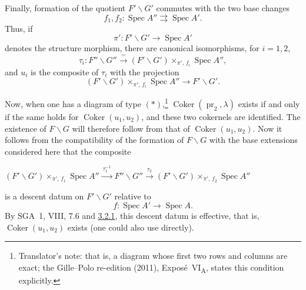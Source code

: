 Finally, formation of the quotient \(F'\backslash G'\) commutes with
the two base changes
\[
  f_1,f_2:\operatorname{Spec}A''
    \rightrightarrows \operatorname{Spec}A'.
\]
Thus, if
\[
  \pi':F'\backslash G'\longrightarrow\operatorname{Spec}A'
\]
denotes the structure morphism, there are canonical isomorphisms,
for \(i=1,2\),
\[
  \tau_i:F''\backslash G''
    \xrightarrow{\ \sim\ }
    (F'\backslash G')\times_{\pi',\,f_i}\operatorname{Spec}A'',
\]
and \(u_i\) is the composite of \(\tau_i\) with the projection
\[
  (F'\backslash G')\times_{\pi',\,f_i}\operatorname{Spec}A''
    \longrightarrow F'\backslash G'.
\]

Now, when one has a diagram of type \((*)\),\footnote{Translator's note: that is, a diagram whose first two
rows and columns are exact; the Gille--Polo re-edition (2011), Exposé~VI\textsubscript{A}, states this
condition explicitly.}
\(\operatorname{Coker}(\operatorname{pr}_2,\lambda)\) exists if and
only if the same holds for \(\operatorname{Coker}(u_1,u_2)\), and these two
cokernels are identified. The existence of \(F\backslash G\)
will therefore follow from that of \(\operatorname{Coker}(u_1,u_2)\).
Now it follows from the compatibility of the formation of \(F\backslash G\) with the
base extensions considered here that the composite
\begin{center}
  \label{diag:sga3-VIA-3.2.3-descent-datum}%
  \(
  (F'\backslash G')\times_{\pi',\,f_1}\operatorname{Spec}A''
    \xrightarrow{\ \tau_1^{-1}\ }
  F''\backslash G''
    \xrightarrow{\ \tau_2\ }
  (F'\backslash G')\times_{\pi',\,f_2}\operatorname{Spec}A''
  \)
\end{center}
is a descent datum on \(F'\backslash G'\) relative to
\[
  f:\operatorname{Spec}A'\longrightarrow\operatorname{Spec}A.
\]
By SGA~1, VIII, 7.6 and \hyperref[par:sga3-VIA-3.2.1]{3.2.1}, this descent datum is effective, that is,
\(\operatorname{Coker}(u_1,u_2)\) exists (one could also use
 directly).
